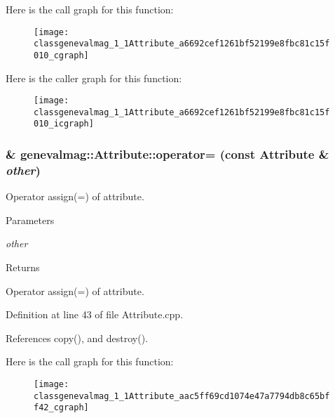 Here is the call graph for this function:\nopagebreak
\begin{figure}[H]
\begin{center}
\leavevmode
\texttt{[image: classgenevalmag\_1\_1Attribute\_a6692cef1261bf52199e8fbc81c15f010\_cgraph]}
\end{center}
\end{figure}




Here is the caller graph for this function:\nopagebreak
\begin{figure}[H]
\begin{center}
\leavevmode
\texttt{[image: classgenevalmag\_1\_1Attribute\_a6692cef1261bf52199e8fbc81c15f010\_icgraph]}
\end{center}
\end{figure}


\hypertarget{classgenevalmag_1_1Attribute_aac5ff69cd1074e47a7794db8c65bff42}{
\subsubsection[{operator=}]{ \& genevalmag::Attribute::operator= (const {\bf Attribute} \& {\em other})}}
\label{classgenevalmag_1_1Attribute_aac5ff69cd1074e47a7794db8c65bff42}
Operator assign(=) of attribute. 
\begin{DoxyParams}{Parameters}
\item[{\em other}]\end{DoxyParams}
\begin{DoxyReturn}{Returns}

\end{DoxyReturn}
Operator assign(=) of attribute. 

Definition at line 43 of file Attribute.cpp.



References copy(), and destroy().



Here is the call graph for this function:\nopagebreak
\begin{figure}[H]
\begin{center}
\leavevmode
\texttt{[image: classgenevalmag\_1\_1Attribute\_aac5ff69cd1074e47a7794db8c65bff42\_cgraph]}
\end{center}
\end{figure}


